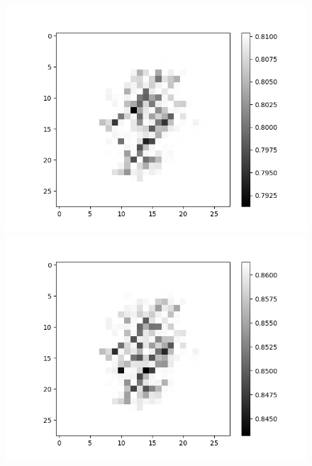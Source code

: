 \begin{figure}[H]
	\centering
	\begin{minipage}[b]{0.45\textwidth}
		\includegraphics[width=\textwidth]{LNN-AND-AND/Digit-2.png}
		\caption{}
		\label{fig:lnn-and-and-digit-2}
	\end{minipage}
	\begin{minipage}[b]{0.45\textwidth}
		\includegraphics[width=\textwidth]{LNN-AND-AND/Digit-3.png}
		\caption{}
		\label{fig:lnn-and-and-digit-3}
	\end{minipage}
	\begin{minipage}[b]{0.45\textwidth}

\end{minipage}
\end{figure}
